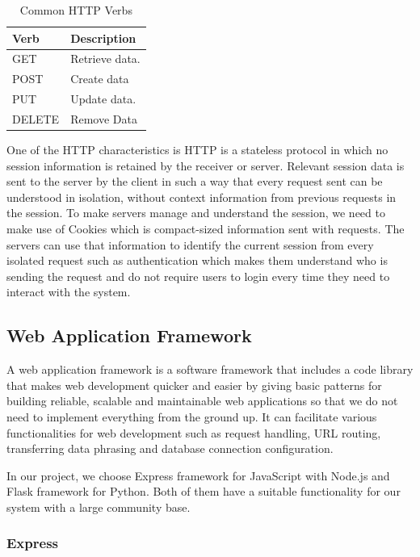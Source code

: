 \documentclass[12pt,oneside,openright,a4paper]{cpe-english-project}
\begin{document}
\begin{table}[!h]
\caption{Common HTTP Verbs}\label{tbl:2CommonHTTPVerbs}
\begin{tabularx}{\textwidth}{l|l} \hline\hline
Verb & Description \\ \hline\hline
GET & Retrieve data. \\ \hline
POST & Create data \\ \hline
PUT & Update data. \\ \hline
DELETE & Remove Data \\ \hline\hline
\end{tabularx}
\end{table}

One of the HTTP characteristics is HTTP is a stateless protocol in which no session information is retained by the receiver or server. Relevant session data is sent to the server by the client in such a way that every request sent can be understood in isolation, without context information from previous requests in the session. \cite{Statelessprotocol} To make servers manage and understand the session, we need to make use of Cookies which is compact-sized information sent with requests. The servers can use that information to identify the current session from every isolated request such as authentication which makes them understand who is sending the request and do not require users to login every time they need to interact with the system.


\subsection{Web Application Framework}

A web application framework is a software framework that includes a code library that makes web development quicker and easier by giving basic patterns for building reliable, scalable and maintainable web applications \cite{WhatIsWebFramework} so that we do not need to implement everything from the ground up. It can facilitate various functionalities for web development such as request handling, URL routing, transferring data phrasing and database connection configuration.

In our project, we choose Express framework for JavaScript with Node.js and Flask framework for Python. Both of them have a suitable functionality for our system with a large community base.

\subsubsection{Express}
\end{document}

